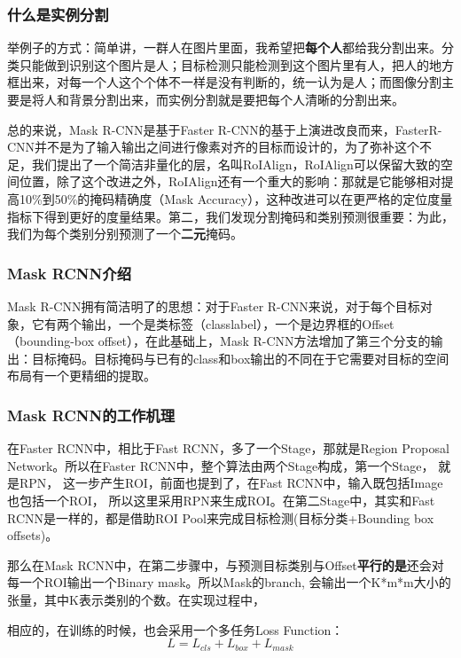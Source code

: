 \subsubsection{什么是实例分割}

举例子的方式：简单讲，一群人在图片里面，我希望把\textbf{每个人}都给我分割出来。分类只能做到识别这个图片是人；目标检测只能检测到这个图片里有人，把人的地方框出来，对每一个人这个个体不一样是没有判断的，统一认为是人；而图像分割主要是将人和背景分割出来，而实例分割就是要把每个人清晰的分割出来。

总的来说，Mask R-CNN是基于Faster R-CNN的基于上演进改良而来，FasterR-CNN并不是为了输入输出之间进行像素对齐的目标而设计的，为了弥补这个不足，我们提出了一个简洁非量化的层，名叫RoIAlign，RoIAlign可以保留大致的空间位置，除了这个改进之外，RoIAlign还有一个重大的影响：那就是它能够相对提高10\%到50\%的掩码精确度（Mask Accuracy），这种改进可以在更严格的定位度量指标下得到更好的度量结果。第二，我们发现分割掩码和类别预测很重要：为此，我们为每个类别分别预测了一个\textbf{二元}掩码。

\subsubsection{Mask RCNN介绍}
Mask R-CNN拥有简洁明了的思想：对于Faster R-CNN来说，对于每个目标对象，它有两个输出，一个是类标签（classlabel），一个是边界框的Offset（bounding-box offset），在此基础上，Mask R-CNN方法增加了第三个分支的输出：目标掩码。目标掩码与已有的class和box输出的不同在于它需要对目标的空间布局有一个更精细的提取。

\subsubsection{Mask RCNN的工作机理}

在Faster RCNN中，相比于Fast RCNN，多了一个Stage，那就是Region Proposal Network。所以在Faster RCNN中，整个算法由两个Stage构成，第一个Stage， 就是RPN， 这一步产生ROI，前面也提到了，在Fast RCNN中，输入既包括Image也包括一个ROI， 所以这里采用RPN来生成ROI。在第二Stage中，其实和Fast RCNN是一样的，都是借助ROI Pool来完成目标检测(目标分类+Bounding box offsets)。

那么在Mask RCNN中，在第二步骤中，与预测目标类别与Offset\textbf{平行的是}还会对每一个ROI输出一个Binary mask。所以Mask的branch, 会输出一个K*m*m大小的张量，其中K表示类别的个数。在实现过程中，

相应的，在训练的时候，也会采用一个多任务Loss Function：
\begin{displaymath}
L = L_{cls} + L_{box} + L_{mask}
\end{displaymath}

